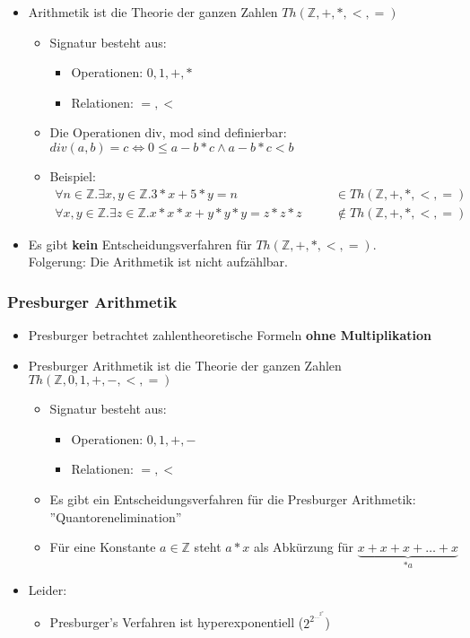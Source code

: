 \documentclass{scrartcl}
\begin{document}
\begin{itemize}
	\item Arithmetik ist die Theorie der ganzen Zahlen $ Th(\mathbb{Z},+,*,<,=) $
	\begin{itemize}
		\item Signatur besteht aus:
		\begin{itemize}
			\item Operationen: $ 0, 1, +, * $
			\item Relationen: $ =, < $
		\end{itemize}
		\item Die Operationen div, mod sind definierbar: \\
		$ div(a,b) = c \iff 0 \leq a - b * c \wedge a - b * c < b $
		\item Beispiel:
		\begin{align*}
			\forall n \in \mathbb{Z}.\exists x,y \in \mathbb{Z}.3 * x + 5 * y = n & \quad & \in Th(\mathbb{Z,+,*,<,=}) \\
			\forall x,y \in \mathbb{Z}.\exists z \in \mathbb{Z}. x*x*x + y*y*y = z*z*z & \quad & \not \in Th(\mathbb{Z},+,*,<,=)
		\end{align*}
	\end{itemize}
	\item Es gibt \textbf{kein} Entscheidungsverfahren für $ Th(\mathbb{Z},+,*,<,=) $. \\
	Folgerung: Die Arithmetik ist nicht aufzählbar.
\end{itemize}

\subsubsection{Presburger Arithmetik}

\begin{itemize}
	\item Presburger betrachtet zahlentheoretische Formeln \textbf{ohne Multiplikation}
	\item Presburger Arithmetik ist die Theorie der ganzen Zahlen $ Th(\mathbb{Z},0,1,+,-,<,=) $
	\begin{itemize}
		\item Signatur besteht aus:
		\begin{itemize}
			\item Operationen: $ 0,1,+,- $
			\item Relationen: $ =,< $
		\end{itemize}
		\item Es gibt ein Entscheidungsverfahren für die Presburger Arithmetik: ''Quantorenelimination''
		\item Für eine Konstante $ a \in \mathbb{Z} $ steht $ a * x $ als Abkürzung für $ \underbrace{x+x+x+\ldots+x}_{*a} $
	\end{itemize}
	\item Leider:
	\begin{itemize}
		\item Presburger's Verfahren ist hyperexponentiell ($ 2^{2^{\ldots^{2^n}}} $)
	\end{itemize}
\end{itemize}
\end{document}
